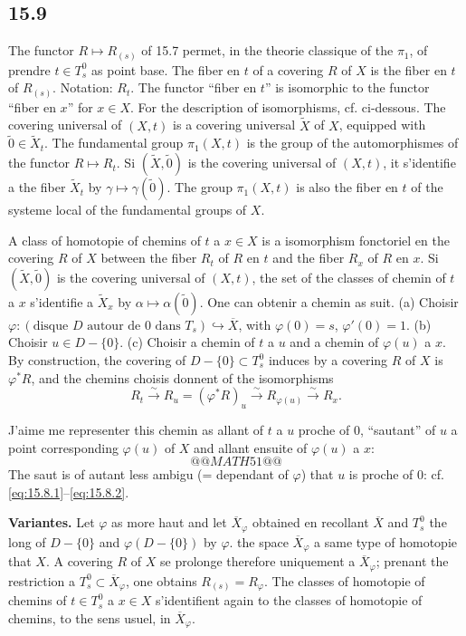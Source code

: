 \documentclass[12pt,a4paper]{article}
\theoremstyle{plain}
\theoremstyle{definition}
\theoremstyle{remark}
\begin{document}
\subsection*{15.9}

The functor $R \mapsto R_{(s)}$ of 15.7 permet, in the theorie classique of the $\pi_1$, of prendre $t \in T_s^0$ as point base. The fiber en $t$ of a covering $R$ of $X$ is the fiber en $t$ of $R_{(s)}$. Notation: $R_t$. The functor ``fiber en $t$'' is isomorphic to the functor ``fiber en $x$'' for $x \in X$. For the description of isomorphisms, cf. ci-dessous. The covering universal of $(X, t)$ is a covering universal $\widetilde{X}$ of $X$, equipped with $\tilde{0} \in \widetilde{X}_t$. The fundamental group $\pi_1(X, t)$ is the group of the automorphismes of the functor $R \mapsto R_t$. Si $(\widetilde{X}, \tilde{0})$ is the covering universal of $(X, t)$, it s'identifie a the fiber $\widetilde{X}_t$ by $\gamma \mapsto \gamma(\tilde{0})$. The group $\pi_1(X, t)$ is also the fiber en $t$ of the systeme local of the fundamental groups of $X$.

A class of homotopie of chemins of $t$ a $x \in X$ is a isomorphism fonctoriel en the covering $R$ of $X$ between the fiber $R_t$ of $R$ en $t$ and the fiber $R_x$ of $R$ en $x$. Si $(\widetilde{X}, \tilde{0})$ is the covering universal of $(X, t)$, the set of the classes of chemin of $t$ a $x$ s'identifie a $\widetilde{X}_x$ by $\alpha \mapsto \alpha(\tilde{0})$. One can obtenir a chemin as suit. (a) Choisir $\varphi : (\text{disque } D \text{ autour de } 0 \text{ dans } T_s) \hookrightarrow \overline{X}$, with $\varphi(0) = s$, $\varphi'(0) = 1$. (b) Choisir $u \in D - \{0\}$. (c) Choisir a chemin of $t$ a $u$ and a chemin of $\varphi(u)$ a $x$. By construction, the covering of $D - \{0\} \subset T_s^0$ induces by a covering $R$ of $X$ is $\varphi^* R$, and the chemins choisis donnent of the isomorphisms
\[
R_t \xrightarrow{\sim} R_u = (\varphi^* R)_u \xrightarrow{\sim} R_{\varphi(u)} \xrightarrow{\sim} R_x.
\]

J'aime me representer this chemin as allant of $t$ a $u$ proche of $0$, ``sautant'' of $u$ a point corresponding $\varphi(u)$ of $X$ and allant ensuite of $\varphi(u)$ a $x$:
\[
@@MATH51@@
\]
The saut is of autant less ambigu (= dependant of $\varphi$) that $u$ is proche of $0$: cf. \eqref{eq:15.8.1}--\eqref{eq:15.8.2}.

\textbf{Variantes.} Let $\varphi$ as more haut and let $\overline{X}_\varphi$ obtained en recollant $\overline{X}$ and $T_s^0$ the long of $D - \{0\}$ and $\varphi(D - \{0\})$ by $\varphi$. the space $\overline{X}_\varphi$ a same type of homotopie that $X$. A covering $R$ of $X$ se prolonge therefore uniquement a $\overline{X}_\varphi$; prenant the restriction a $T_s^0 \subset \overline{X}_\varphi$, one obtains $R_{(s)} = R_\varphi$. The classes of homotopie of chemins of $t \in T_s^0$ a $x \in X$ s'identifient again to the classes of homotopie of chemins, to the sens usuel, in $\overline{X}_\varphi$.
\end{document}
